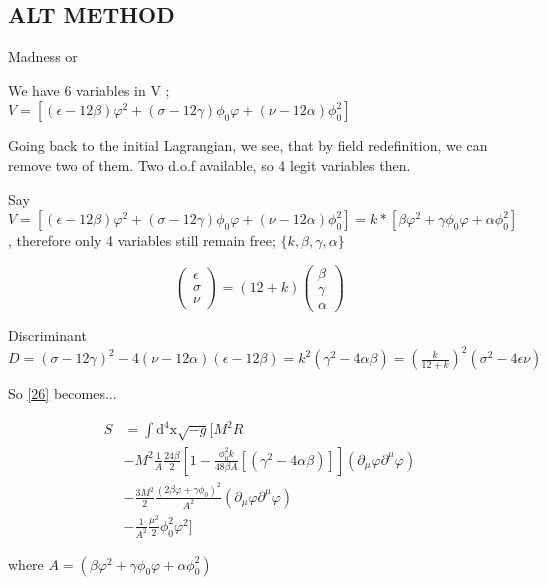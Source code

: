 \documentclass{article}
\begin{document}
\subsection{ALT METHOD }
Madness or 

We have 6 variables in V ; $V = [(\epsilon - 12\beta) \varphi^2 + (\sigma - 12\gamma) \phi_0 \varphi + (\nu - 12\alpha)\phi^2_0]$

Going back to the initial Lagrangian, we see, that by field redefinition, we can remove two of them. Two d.o.f available, so 4 legit variables then.

Say $V = [(\epsilon - 12\beta) \varphi^2 + (\sigma - 12\gamma) \phi_0 \varphi + (\nu - 12\alpha)\phi^2_0] = k*[\beta \varphi^2  +\gamma \phi_0 \varphi +\alpha \phi^2_0 ]$, therefore only 4 variables still remain free; $\{k, \beta, \gamma, \alpha \}$

\begin{equation}
    \begin{pmatrix}
        \epsilon \\ \sigma \\ \nu 
    \end{pmatrix}
    = (12+k)
    \begin{pmatrix}
        \beta \\ \gamma \\ \alpha
    \end{pmatrix}
\end{equation}

Discriminant $D = (\sigma -12 \gamma )^2-4 (\nu -12 \alpha ) (\epsilon -12 \beta ) = k^2 (\gamma^2 - 4\alpha \beta) = (\frac{k}{12+k})^2 (\sigma^2 -4 \epsilon \nu)$

So \ref{26} becomes...

\begin{equation} 
    \begin{aligned}
        S &= \int \text{d}^4\text{x} \sqrt{-g} [ M^2 R \\
        &- M^2 \frac{1}{A} \frac{24 \beta}{2} \left[ 1 - \frac{\phi_0^2 k}{48\beta A} [(\gamma^2 - 4\alpha \beta) ] \right]  (\partial_\mu \varphi \partial^\mu \varphi)\\ 
        &- \frac{3M^2}{2} \frac{(2\beta \varphi + \gamma \phi_0)^2}{A^2} (\partial_\mu \varphi \partial^\mu \varphi)  \\
        &-  \frac{1}{A^2} \frac{\mu^2}{2} \phi^2_0 \varphi^2 ] 
    \end{aligned}
\end{equation}

where $A = (\beta \varphi^2  +\gamma \phi_0 \varphi +\alpha \phi^2_0)$
\end{document}
